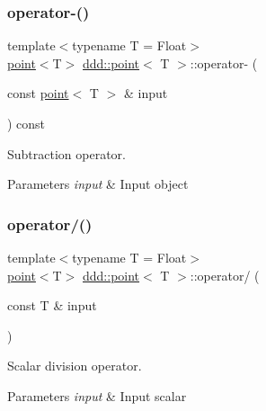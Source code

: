 \subsubsection{\texorpdfstring{operator-\/()}{operator-()}}
{\footnotesize\ttfamily template$<$typename T = Float$>$ \\
\hyperlink{classddd_1_1point}{point}$<$T$>$ \hyperlink{classddd_1_1point}{ddd\+::point}$<$ T $>$\+::operator-\/ (\begin{DoxyParamCaption}\item[{const \hyperlink{classddd_1_1point}{point}$<$ T $>$ \&}]{input }\end{DoxyParamCaption}) const\hspace{0.3cm}{\ttfamily [inline]}}



Subtraction operator. 


\begin{DoxyParams}{Parameters}
{\em input} & Input object \\
\hline
\end{DoxyParams}
\mbox{\label{classddd_1_1point_a9f347ae983daa189f3d7a127dbacc057}} 
\subsubsection{\texorpdfstring{operator/()}{operator/()}}
{\footnotesize\ttfamily template$<$typename T = Float$>$ \\
\hyperlink{classddd_1_1point}{point}$<$T$>$ \hyperlink{classddd_1_1point}{ddd\+::point}$<$ T $>$\+::operator/ (\begin{DoxyParamCaption}\item[{const T \&}]{input }\end{DoxyParamCaption})\hspace{0.3cm}{\ttfamily [inline]}}



Scalar division operator. 


\begin{DoxyParams}{Parameters}
{\em input} & Input scalar \\
\hline
\end{DoxyParams}
\mbox{\label{classddd_1_1point_ae767e47c1a939d5e6d24b3f810f43170}} 
